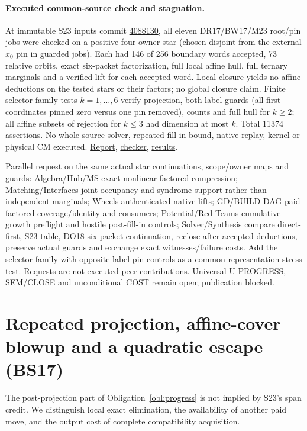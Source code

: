 \documentclass[11pt]{article}
\begin{document}
\paragraph{Executed common-source check and stagnation.}
At immutable S23 inputs commit \href{https://github.com/j15marti/pnp/commit/40881304c3fb5cff076fb8f52142a55d44b9291d}{4088130}, all eleven DR17/BW17/M23 root/pin jobs were checked on a positive four-owner star (chosen disjoint from the external $x_0$ pin in guarded jobs). Each had 146 of 256 boundary words accepted, 73 relative orbits, exact six-packet factorization, full local affine hull, full ternary marginals and a verified lift for each accepted word. Local closure yields no affine deductions on the tested stars or their factors; no global closure claim. Finite selector-family tests $k=1,\ldots,6$ verify projection, both-label guards (all first coordinates pinned zero versus one pin removed), counts and full hull for $k\ge2$; all affine subsets of rejection for $k\le3$ had dimension at most $k$. Total 11374 assertions. No whole-source solver, repeated fill-in bound, native replay, kernel or physical CM executed. \href{https://github.com/j15marti/pnp/commit/9d1e03a2e852edaa7cdea9a390a284ba637f4918}{Report}, \href{https://github.com/j15marti/pnp/commit/d26566fa666b693cd85f5dbb04c66ef3ce435b5a}{checker}, \href{https://github.com/j15marti/pnp/commit/6069b8631b676fe13bddc669a2a8963ab30b4d13}{results}.

Parallel request on the same actual star continuations, scope/owner maps and guards: Algebra/Hub/MS exact nonlinear factored compression; Matching/Interfaces joint occupancy and syndrome support rather than independent marginals; Wheels authenticated native lifts; GD/BUILD DAG paid factored coverage/identity and consumers; Potential/Red Teams cumulative growth preflight and hostile post-fill-in controls; Solver/Synthesis compare direct-first, S23 table, DO18 six-packet continuation, reclose after accepted deductions, preserve actual guards and exchange exact witnesses/failure costs. Add the selector family with opposite-label pin controls as a common representation stress test. Requests are not executed peer contributions. Universal U-PROGRESS, SEM/CLOSE and unconditional COST remain open; publication blocked.


\section{Repeated projection, affine-cover blowup and a quadratic escape (BS17)}\label{sec:bs17}
The post-projection part of Obligation~\ref{obl:progress} is not implied by S23's span credit. We distinguish local exact elimination, the availability of another paid move, and the output cost of complete compatibility acquisition.
\end{document}
